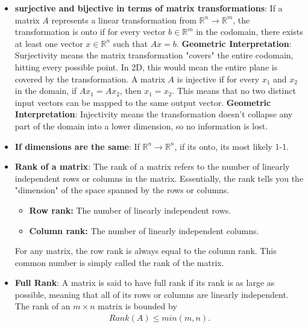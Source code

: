 \documentclass{report}
\begin{document}
\begin{itemize}
            \item \textbf{surjective and bijective in terms of matrix transformations}:
                \bigbreak \noindent 
                If a matrix $A$ represents a linear transformation from $\mathbb{R}^n \to \mathbb{R}^m$, the transformation is onto if for every vector $b \in \mathbb{R}^m$ in the codomain, there exists at least one vector $x \in \mathbb{R}^n$ such that $Ax = b$.
                \bigbreak \noindent 
                \textbf{Geometric Interpretation}: Surjectivity means the matrix transformation "covers" the entire codomain, hitting every possible point. In 2D, this would mean the entire plane is covered by the transformation.
                \bigbreak \noindent 
                A matrix $A$ is injective if for every $x_1$ and $x_2$ in the domain, if $Ax_1 = Ax_2$, then $x_1 = x_2$. This means that no two distinct input vectors can be mapped to the same output vector.
                \bigbreak \noindent 
            \textbf{Geometric Interpretation}: Injectivity means the transformation doesn’t collapse any part of the domain into a lower dimension, so no information is lost.
        \item \textbf{If dimensions are the same}: If $\mathbb{R}^{n} \to \mathbb{R}^{n}$, if its onto, its most likely 1-1.
        \item \textbf{Rank of a matrix}: The rank of a matrix refers to the number of linearly independent rows or columns in the matrix. Essentially, the rank tells you the "dimension" of the space spanned by the rows or columns.
            \begin{itemize}
                \item \textbf{Row rank:} The number of linearly independent rows.
                \item \textbf{Column rank:} The number of linearly independent columns.
            \end{itemize}
            For any matrix, the row rank is always equal to the column rank. This common number is simply called the rank of the matrix.
        \item \textbf{Full Rank}: A matrix is said to have full rank if its rank is as large as possible, meaning that all of its rows or columns are linearly independent.
            \bigbreak \noindent 
            The rank of an $m \times n$ matrix is bounded by 
            \begin{align*}
                Rank(A) \leq min(m,n)
            .\end{align*}
            \bigbreak \noindent 

\end{itemize}
\end{document}
